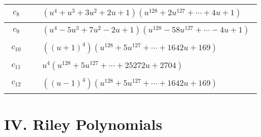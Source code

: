\documentclass[1p]{elsarticle_modified}
\theoremstyle{definition}
\begin{document}
\begin{tabular}{m{50pt}|m{274pt}}
\hline $$\begin{aligned}c_{8}\end{aligned}$$&$\begin{aligned}
&(u^4+u^3+3 u^2+2 u+1)(u^{128}+2 u^{127}+\cdots+4 u+1)
\end{aligned}$\\
\hline $$\begin{aligned}c_{9}\end{aligned}$$&$\begin{aligned}
&(u^4-5 u^3+7 u^2-2 u+1)(u^{128}-58 u^{127}+\cdots-4 u+1)
\end{aligned}$\\
\hline $$\begin{aligned}c_{10}\end{aligned}$$&$\begin{aligned}
&((u+1)^4)(u^{128}+5 u^{127}+\cdots+1642 u+169)
\end{aligned}$\\
\hline $$\begin{aligned}c_{11}\end{aligned}$$&$\begin{aligned}
&u^4(u^{128}+5 u^{127}+\cdots+25272 u+2704)
\end{aligned}$\\
\hline $$\begin{aligned}c_{12}\end{aligned}$$&$\begin{aligned}
&((u-1)^4)(u^{128}+5 u^{127}+\cdots+1642 u+169)
\end{aligned}$\\
\hline
\end{tabular}\newpage\renewcommand{\arraystretch}{1}
\centering \section*{ IV. Riley Polynomials}
\end{document}
